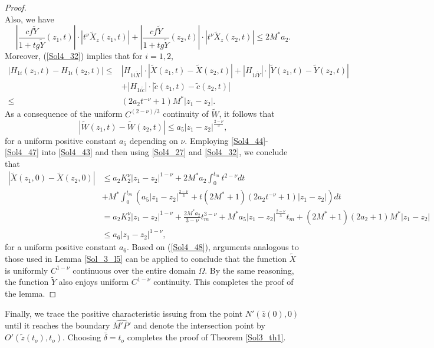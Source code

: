 \documentclass[3p,11pt]{elsarticle}
\numberwithin{equation}{section}
\begin{document}
\begin{proof}
\begin{equation}
     \end{equation}
     Also, we have
     \begin{equation*}\label{Sol4_45}
         \left|\frac{cf\widetilde Y}{1+tg\widetilde Y}(z_1,t)\right| \cdot|t^\nu\widetilde X_z(z_1,t)|+ \left|\frac{cf\widetilde Y}{1+tg\widetilde Y}(z_2,t)\right| \cdot|t^\nu\widetilde X_z(z_2,t)|\leq 2M^*a_2.
     \end{equation*}
     Moreover, (\ref{Sol4_32}) implies that for $i=1,2$,
     \begin{equation*}\label{Sol4_46}
         \begin{split}
             |H_{1i}(z_1,t)-H_{1i}(z_2,t)|\leq& |H_{1i\widetilde X}|\cdot |\widetilde X(z_1,t)-\widetilde X(z_2,t)|+|H_{1i\widetilde Y}|\cdot |\widetilde Y(z_1,t)-\widetilde Y(z_2,t)|\\
             &+|H_{1i\tilde c}|\cdot |\tilde c(z_1,t)-\tilde c(z_2,t)|\\
             \leq &\left(2a_2t^{-\nu}+1 \right)M^*|z_1-z_2|.
         \end{split}
     \end{equation*}
     As a consequence of the uniform $C^{(2-\nu)/3}$ continuity of $\widetilde W$, it follows that
     \begin{equation}\label{Sol4_47}
         |\widetilde W(z_1,t)-\widetilde W(z_2,t)|\leq a_5|z_1-z_2|^{\frac{2-\nu}{3}},
     \end{equation}
     for a uniform positive constant $a_5$ depending on $\nu$. Employing \eqref{Sol4_44}-\eqref{Sol4_47} into \eqref{Sol4_43} and then using \eqref{Sol4_27} and \eqref{Sol4_32}, we conclude that
     \begin{equation}\label{Sol4_48}
         \begin{split}
              |\widetilde X(z_1,0)-\widetilde X(z_2,0)|&\leq a_2K_2^\nu|z_1-z_2|^{1-\nu}+2M^*a_2\int_0^{t_m} t^{2-\nu} dt\\
              &+M^*\int_0^{t_m} \left(a_5|z_1-z_2|^{\frac{2-\nu}{3}}+t(2M^*+1)(2a_2t^{-\nu}+1)|z_1-z_2| \right)dt\\
              &= a_2K_2^\nu|z_1-z_2|^{1-\nu}+\frac{2M^*a_2}{3-\nu}t_m^{3-\nu} +M^*a_5|z_1-z_2|^{\frac{2-\nu}{3}}t_m+(2M^*+1)(2a_2+1)M^*|z_1-z_2|\\&\leq a_6|z_1-z_2|^{1-\nu},
         \end{split}
     \end{equation}
     for a uniform positive constant $a_6$. Based on (\ref{Sol4_48}), arguments analogous to those used in Lemma \ref{Sol_3_l5} can be applied to conclude that the function $\widetilde X$ is uniformly $C^{1-\nu}$ continuous over the entire domain $\Omega$. By the same reasoning, the function $\widetilde Y$ also enjoys uniform $C^{1-\nu}$ continuity. This completes the proof of the lemma.
 \end{proof}
 Finally, we trace the positive characteristic issuing from the point $N'(\bar z(0),0)$ until it reaches the boundary $\widehat{M'P'}$ and denote the intersection point by $O'(\tilde z(t_{o}), t_{o})$. Choosing $\bar{\delta}=t_{o}$ completes the proof of Theorem \ref{Sol3_th1}.
\end{document}
